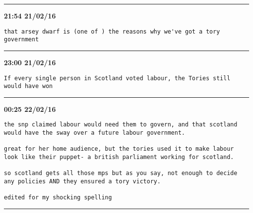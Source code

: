\hrule%

\begin{adjustwidth}{0cm}{0cm}
\footnotesize \textbf{21:54 21/02/16}

\begin{lstlisting}[breaklines, breakatwhitespace, basicstyle=\small, frame=leftline]
that arsey dwarf is (one of ) the reasons why we've got a tory government
\end{lstlisting}
\end{adjustwidth}

\hrule%

\begin{adjustwidth}{2cm}{0cm}
\footnotesize \textbf{23:00 21/02/16}

\begin{lstlisting}[breaklines, breakatwhitespace, basicstyle=\small, frame=leftline]
If every single person in Scotland voted labour, the Tories still would have won
\end{lstlisting}
\end{adjustwidth}

\hrule%

\begin{adjustwidth}{4cm}{0cm}
\footnotesize \textbf{00:25 22/02/16}

\begin{lstlisting}[breaklines, breakatwhitespace, basicstyle=\small, frame=leftline]
the snp claimed labour would need them to govern, and that scotland would have the sway over a future labour government. 

great for her home audience, but the tories used it to make labour look like their puppet- a british parliament working for scotland. 

so scotland gets all those mps but as you say, not enough to decide any policies AND they ensured a tory victory. 

edited for my shocking spelling
\end{lstlisting}
\end{adjustwidth}

\hrule%

